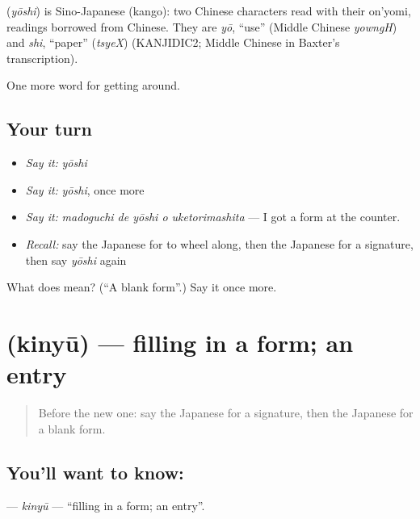 \begin{cousinweb}
\textbf{} (\emph{yōshi}) is Sino-Japanese (kango): two Chinese characters read with their on'yomi, readings borrowed from Chinese. They are \emph{yō}, \textquotedblleft{}use\textquotedblright{} (Middle Chinese \emph{yowngH}) and \emph{shi}, \textquotedblleft{}paper\textquotedblright{} (\emph{tsyeX}) (KANJIDIC2; Middle Chinese in Baxter's transcription).
\end{cousinweb}

\begin{grammarlens}[title={What you've built}]
One more word for getting around.
\end{grammarlens}

\subsection*{Your turn}
\begin{itemize}
\raggedright
  \item \emph{Say it:} \emph{yōshi}
  \item \emph{Say it:} \emph{yōshi}, once more
  \item \emph{Say it:} \emph{madoguchi de yōshi o uketorimashita} — I got a form at the counter.
  \item \emph{Recall:} say the Japanese for to wheel along, then the Japanese for a signature, then say \emph{yōshi} again
\end{itemize}

\begin{tcolorbox}[breakable,colback=teal!4,colframe=teal!35!black,title={Before you move on}]
What does  mean? (\textquotedblleft{}A blank form\textquotedblright{}.) Say it once more.
\end{tcolorbox}
\section[\texorpdfstring{\ja{きにゅう} (kinyū)}{きにゅう (kinyū)}]{ (kinyū) — filling in a form; an entry}

\label{lesson:JA-C418-kinyuu}



\begin{quote}
Before the new one: say the Japanese for a signature, then the Japanese for a blank form.
\end{quote}

\subsection*{You'll want to know: }
\textbf{} — \emph{kinyū} — \textquotedblleft{}filling in a form; an entry\textquotedblright{}.

